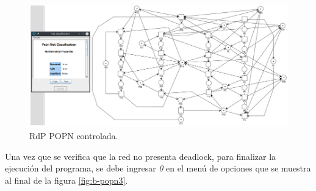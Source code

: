 \begin{figure}[H]
	\centering
	\includegraphics[width=\textwidth]{Figures/algoritmo4/popn_imag3.png}
	\caption{RdP POPN controlada.}
	\label{fig:Rdp-POPN-Contv4}
\end{figure}
\bigskip

Una vez que se verifica que la red no presenta deadlock, para finalizar la ejecución del programa, se debe ingresar \textit{0} en el menú de opciones que se muestra al final de la figura \ref{fig:b-popn3}. 